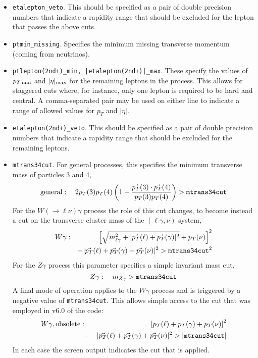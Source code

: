 \documentclass{article}
\begin{document}
\begin{itemize}
\item {\tt etalepton\_veto}. This should be specified as a pair of double
precision numbers that indicate a rapidity range that should be excluded
for the lepton that passes the above cuts.

\item {\tt ptmin\_missing}. Specifies the minimum missing transverse
momentum (coming from neutrinos).

\item {\tt ptlepton(2nd+)\_min, |etalepton(2nd+)|\_max}. These specify
the values of $p_{T,{\rm min}}$ and $|\eta|_{\rm max}$ for the remaining
leptons in the process. This allows for staggered cuts where, for
instance, only one lepton is required to be hard and central.
A comma-separated pair
may be used on either line to indicate a range of allowed values for
$p_T$ and $|\eta|$.

\item {\tt etalepton(2nd+)\_veto}. This should be specified as a pair of double
precision numbers that indicate a rapidity range that should be excluded
for the remaining leptons.

\item {\tt mtrans34cut}. For general processes, this specifies the
minimum transverse mass of particles 3 and 4,
\begin{equation}
\mbox{general}: \quad 2 p_T(3) p_T(4) \left( 1 - \frac{\vec{p_T}(3) \cdot \vec{p_T}(4)}{p_T(3) p_T(4)} \right) 
> {\tt mtrans34cut} 
\end{equation}
For the $W(\to \ell \nu)\gamma$ process the role of this cut changes, to become
instead a cut on the transverse cluster mass of the $(\ell\gamma,\nu)$ system,
\begin{eqnarray}
 W\gamma: && \left[ \sqrt{m_{\ell\gamma}^2 + |\vec{p_T}(\ell)+\vec{p_T}(\gamma)|^2} + p_T(\nu) \right]^2
  \nonumber \\ &&
  -|\vec{p_T}(\ell)+\vec{p_T}(\gamma)+\vec{p_T}(\nu)|^2 > {\tt mtrans34cut}^2
\end{eqnarray}
For the $Z\gamma$ process this parameter specifies a simple invariant mass cut,
\begin{equation}
 Z\gamma: \quad m_{Z\gamma} > {\tt mtrans34cut}
\end{equation}
A final mode of operation applies to the $W\gamma$ process and is triggered by a negative value
of {\tt mtrans34cut}. This allows simple access to the cut that was employed in v6.0 of the code:
\begin{eqnarray}
 W\gamma, \mbox{obsolete}: &&
   \left[ p_T(\ell) +  p_T(\gamma) +  p_T(\nu) \right]^2 \nonumber \\ 
  &-&|\vec{p_T}(\ell)+\vec{p_T}(\gamma)+\vec{p_T}(\nu)|^2 > |{\tt mtrans34cut}|
\end{eqnarray}
In each case the screen output indicates the cut that is applied.


\end{itemize}
\end{document}
